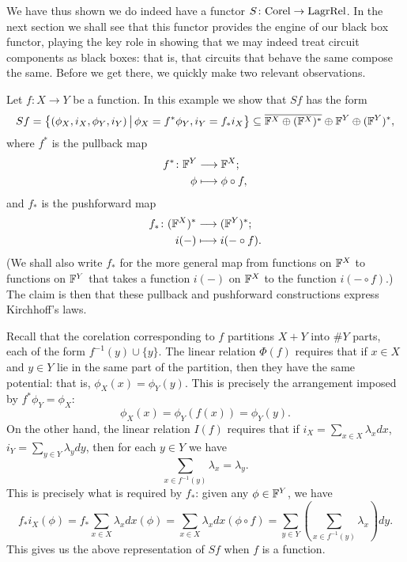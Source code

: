 We have thus shown we do indeed have a functor $S{\colon} \mathrm{Corel} \to
\mathrm{LagrRel}$. In the next section we shall see that this functor provides
the engine of our black box functor, playing the key role in showing that we
may indeed treat circuit components as black boxes: that is, that circuits that
behave the same compose the same. Before we get there, we quickly make two
relevant observations.

\begin{example} \label{ex:sympfunction}
  Let $f: X \to Y$ be a function. In this example we show that $Sf$ has the form 
  \[
    Sf = \big\{(\phi_X,i_X,\phi_Y,i_Y) \, \big\vert \, \phi_X = f^\ast\phi_Y,
    i_Y = f_\ast i_X \big\} \subseteq \overline{{\mathbb F}^X \oplus ({\mathbb F}^X)^\ast} \oplus
    {\mathbb F}^Y \oplus ({\mathbb F}^Y)^\ast,
  \]
  where $f^\ast$ is the pullback map
  \begin{align*}
    f^\ast{\colon} {\mathbb F}^Y &\longrightarrow {\mathbb F}^X; \\
    \phi &\longmapsto \phi \circ f,
  \end{align*}
  and $f_\ast$ is the pushforward map
  \begin{align*}
    f_\ast{\colon} ({\mathbb F}^X)^\ast &\longrightarrow ({\mathbb F}^Y)^\ast; \\
    i(-) &\longmapsto i(-\circ f).
  \end{align*}
  (We shall also write $f_\ast$ for the more general map from functions on
  ${\mathbb F}^X$ to functions on ${\mathbb F}^Y$ that takes a function $i(-)$ on ${\mathbb F}^X$ to the
  function $i(-\circ f)$.) The claim is then that these pullback and pushforward
  constructions express Kirchhoff's laws.

  Recall that the corelation corresponding to $f$ partitions $X+Y$ into $\#Y$
  parts, each of the form $f^{-1}(y) \cup \{y\}$. The linear relation $\Phi(f)$
  requires that if $x \in X$ and $y \in Y$ lie in the same part of the
  partition, then they have the same potential: that is, $\phi_X(x) =
  \phi_Y(y)$. This is precisely the arrangement imposed by $f^\ast \phi_Y =
  \phi_X$: 
  \[
    \phi_X(x) = \phi_Y(f(x)) =\phi_Y(y).
  \] 
  On the other hand, the linear relation $I(f)$ requires that if $i_X = \sum_{x 
  \in X}\lambda_xdx$, $i_Y = \sum_{y \in Y}\lambda_y dy$, then for each $y \in Y$
  we have 
  \[
    \sum_{x \in f^{-1}(y)} \lambda_x = \lambda_y.
  \]
  This is precisely what is required by $f_\ast$: given any $\phi \in {\mathbb F}^Y$, we
  have
  \[
    f_\ast i_X(\phi) = f_\ast \sum_{x \in X}\lambda_xdx(\phi) = \sum_{x
    \in X}\lambda_xdx(\phi \circ f)= \sum_{y \in Y}\left( \sum_{x \in f^{-1}(y)}
    \lambda_x\right)dy.
  \]
  This gives us the above representation of $Sf$ when $f$ is a function.
\end{example}


